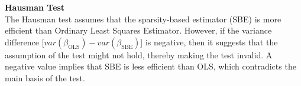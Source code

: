 \textbf{Hausman Test}\\
The Hausman test assumes that the sparsity-based estimator (SBE) is more efficient than Ordinary Least Squares Estimator. However, if the variance difference [$var(\beta_\text{OLS}) -  var(\beta_\text{SBE})$] is negative, then it suggests that the assumption of the test might not hold, thereby making the test invalid. A negative value implies that SBE is less efficient than OLS, which contradicts the main basis of the test.
